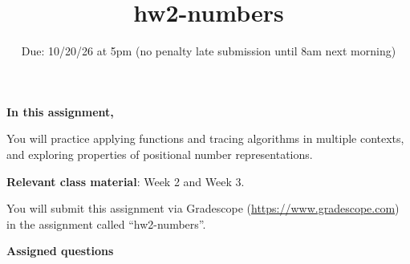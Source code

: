 

\title{hw2-numbers}
\date{Due: 10/20/26 at 5pm (no penalty late submission until 8am next morning)}

\maketitle
\thispagestyle{fancy}


{\bf In this assignment,}

You will practice applying functions and tracing algorithms in multiple contexts, 
and exploring properties of positional number representations.

{\bf Relevant class material}: Week 2 and Week 3.

You will submit this assignment via Gradescope
(\href{https://www.gradescope.com}{https://www.gradescope.com}) 
in the assignment called ``hw2-numbers''.

\instructions

{\bf Assigned questions}

